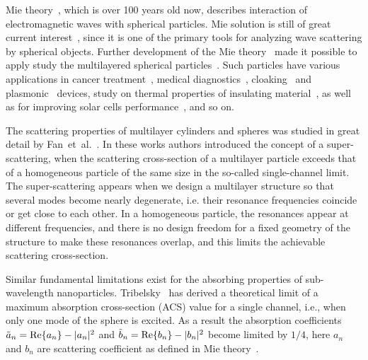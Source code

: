 \documentclass[aps,prl,twocolumn,showpacs,superscriptaddress,groupedaddress]{revtex4-1}
\begin{document}
\maketitle %

Mie theory~\cite{Mie-1908}, which is over 100 years old now, describes
interaction of electromagnetic waves with spherical particles. Mie
solution is still of great current
interest~\cite{Suzuki-2008,MacKowski-2012,Lerme-2000,Xu-2005,Li-2006,Gogoi-2010,Santiago-2011},
since it is one of the primary tools for analyzing wave scattering by
spherical objects. Further development of the Mie
theory~\cite{Yang-2003, Pena-scattnlay-2009} made it possible to apply
study the multilayered spherical
particles~\cite{Sheehan-2013,Selmke-2012}.  Such particles have
various applications in cancer treatment~\cite{Zhang-2010,
  Hirsch-2003}, medical diagnostics~\cite{Allain-2002},
cloaking~\cite{Qui-2009, Semouchkina-2013, Ladutenko-2014} and
plasmonic~\cite{Martin-2013, Alu-2005} devices, study on thermal
properties of insulating material~\cite{Xie-2013}, as well as for
improving solar cells performance~\cite{Kameya-2011,Mann-2011}, and so
on.

The scattering properties of multilayer cylinders and spheres was
studied in great detail by Fan~et~al.~\cite{Fan-2010,Fan-2011}.  In
these works authors introduced the concept of a super-scattering, when
the scattering cross-section of a multilayer particle exceeds that of
a homogeneous particle of the same size in the so-called
single-channel limit. The super-scattering appears when we design a
multilayer structure so that several modes become nearly degenerate,
i.e. their resonance frequencies coincide or get close to each
other. In a homogeneous particle, the resonances appear at different
frequencies, and there is no design freedom for a fixed geometry of
the structure to make these resonances overlap, and this limits the
achievable scattering cross-section.

Similar fundamental limitations exist for the absorbing properties of
sub-wavelength nanoparticles.  Tribelsky~\cite{Tribelsky-2011} has
derived a theoretical limit of a maximum absorption cross-section
(ACS) value for a single channel, i.e., when only one mode of the
sphere is excited.  As a result the absorption coefficients
$\tilde{a}_n= {\rm Re}\{a_n\} - |a_n|^2 $ and $\tilde{b}_n= {\rm
  Re}\{b_n\} - |b_n|^2 $ become limited by $1/4$, here $a_n$ and $b_n$
are scattering coefficient as defined in Mie
theory~\cite{Bohren-1983}.
\end{document}
